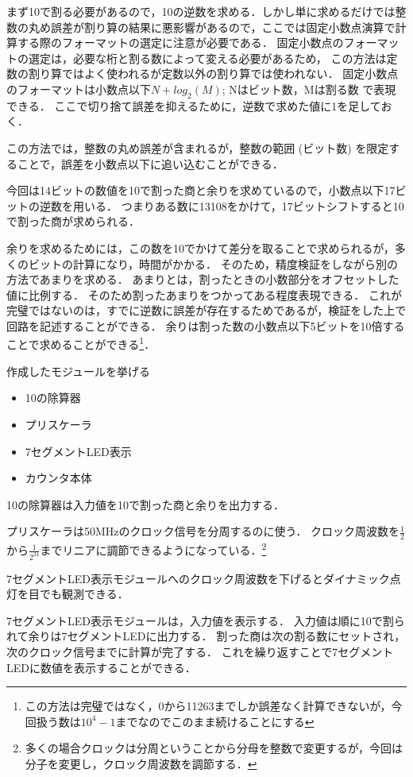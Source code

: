 まず10で割る必要があるので，10の逆数を求める．しかし単に求めるだけでは整数の丸め誤差が割り算の結果に悪影響があるので，ここでは固定小数点演算で計算する際のフォーマットの選定に注意が必要である．
固定小数点のフォーマットの選定は，必要な桁と割る数によって変える必要があるため，
この方法は定数の割り算ではよく使われるが定数以外の割り算では使われない．
固定小数点のフォーマットは小数点以下$N+log_2(M)$; Nはビット数，Mは割る数 で表現できる．
ここで切り捨て誤差を抑えるために，逆数で求めた値に1を足しておく．

この方法では，整数の丸め誤差が含まれるが，整数の範囲 (ビット数) を限定することで，誤差を小数点以下に追い込むことができる\cite{int-div-1937}．

今回は14ビットの数値を10で割った商と余りを求めているので，小数点以下17ビットの逆数を用いる．
つまりある数に13108をかけて，17ビットシフトすると10で割った商が求められる．

余りを求めるためには，この数を10でかけて差分を取ることで求められるが，多くのビットの計算になり，時間がかかる．
そのため，精度検証をしながら別の方法であまりを求める．
あまりとは，割ったときの小数部分をオフセットした値に比例する．
そのため割ったあまりをつかってある程度表現できる．
これが完璧ではないのは，すでに逆数に誤差が存在するためであるが，検証をした上で回路を記述することができる．
余りは割った数の小数点以下5ビットを10倍することで求めることができる\footnote{この方法は完璧ではなく，0から11263までしか誤差なく計算できないが，今回扱う数は$10^4-1$までなのでこのまま続けることにする}．

作成したモジュールを挙げる
\begin{itemize}
\item{10の除算器}
\item{プリスケーラ}
\item{7セグメントLED表示}
\item{カウンタ本体}
\end{itemize}

10の除算器は入力値を10で割った商と余りを出力する．

プリスケーラは50MHzのクロック信号を分周するのに使う．
クロック周波数を$\frac{1}{2}$から$\frac{1}{2^{24}}$までリニアに調節できるようになっている．\footnote{多くの場合クロックは分周ということから分母を整数で変更するが，今回は分子を変更し，クロック周波数を調節する．}

7セグメントLED表示モジュールへのクロック周波数を下げるとダイナミック点灯を目でも観測できる．

7セグメントLED表示モジュールは，入力値を表示する．
入力値は順に10で割られて余りは7セグメントLEDに出力する．
割った商は次の割る数にセットされ，次のクロック信号までに計算が完了する．
これを繰り返すことで7セグメントLEDに数値を表示することができる．


